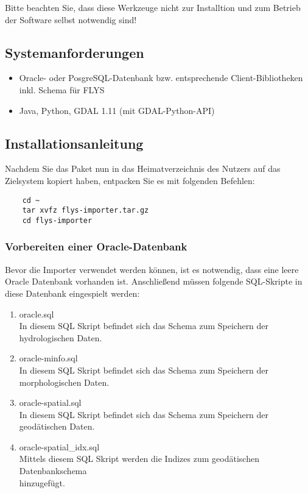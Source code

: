 Bitte beachten Sie, dass diese Werkzeuge nicht zur Installtion und zum Betrieb
der Software selbst notwendig sind!

\subsection{Systemanforderungen}
\label{Systemanforderungen}
\begin{itemize}
  \item Oracle- oder PosgreSQL-Datenbank bzw. entsprechende Client-Bibliotheken
    inkl. Schema für FLYS
  \item Java, Python, GDAL 1.11 (mit GDAL-Python-API)
\end{itemize}

\subsection{Installationsanleitung}
\label{Installationsanleitung}

Nachdem Sie das Paket nun in das Heimatverzeichnis des Nutzers auf das
Zielsystem kopiert haben, entpacken Sie es mit folgenden Befehlen:

\begin{lstlisting}
    cd ~
    tar xvfz flys-importer.tar.gz
    cd flys-importer
\end{lstlisting}


\subsubsection{Vorbereiten einer Oracle-Datenbank}
Bevor die Importer verwendet werden können, ist es notwendig, dass eine leere
Oracle Datenbank vorhanden ist. Anschließend müssen folgende SQL-Skripte in
diese Datenbank eingespielt werden:

\begin{enumerate}
\item oracle.sql \\
In diesem SQL Skript befindet sich das Schema zum Speichern der hydrologischen
Daten.

\item oracle-minfo.sql \\
In diesem SQL Skript befindet sich das Schema zum Speichern der morphologischen
Daten.

\item oracle-spatial.sql \\
In diesem SQL Skript befindet sich das Schema zum Speichern der geodätischen
Daten.

\item oracle-spatial\_idx.sql \\
Mittels diesem SQL Skript werden die Indizes zum geodätischen Datenbankschema\\
hinzugefügt.

\end{enumerate}

